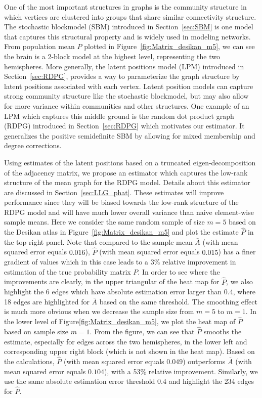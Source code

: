 One of the most important structures in graphs is the community structure in which vertices are clustered into groups that share similar connectivity structure. The stochastic blockmodel (SBM) \citep{holland1983stochastic} introduced in Section~\ref{sec:SBM} is one model that captures this structural property and is widely used in modeling networks. From population mean $P$ plotted in Figure~\ref{fig:Matrix_desikan_m5}, we can see the brain is a 2-block model at the highest level, representing the two hemispheres.
More generally, the latent positions model (LPM) \citep{hoff2002latent} introduced in Section~\ref{sec:RDPG}, provides a way to parameterize the graph structure by latent positions associated with each vertex. 
Latent position models can capture strong community structure like the stochastic blockmodel, but may also allow for more variance within communities and other structures.
One example of an LPM which captures this middle ground is the random dot product graph (RDPG) \citep{young2007random, nickel2008random} introduced in Section~\ref{sec:RDPG} which motivates our estimator. It generalizes the positive semidefinite SBM by allowing for mixed membership and degree corrections.

Using estimates of the latent positions based on a truncated eigen-decomposition of the adjacency matrix, we propose an estimator which captures the low-rank structure of the mean graph for the RDPG model. Details about this estimator are discussed in Section~\ref{sec:LLG_phat}.
These estimates will improve performance since they will be biased towards the low-rank structure of the RDPG model and will have much lower overall variance than naive element-wise sample means. Here we consider the same random sample of size $m=5$ based on the Desikan atlas in Figure~\ref{fig:Matrix_desikan_m5} and plot the estimate $\hat{P}$ in the top right panel. Note that compared to the sample mean $\bar{A}$ (with mean squared error equals $0.016$), $\hat{P}$ (with mean squared error equals $0.015$) has a finer gradient of values which in this case leads to a 3\% relative improvement in estimation of the true probability matrix $P$. In order to see where the improvements are clearly, in the upper triangular of the heat map for $\hat{P}$, we also highlight the 6 edges which have absolute estimation error larger than $0.4$, where 18 edges are highlighted for $\bar{A}$ based on the same threshold. 
The smoothing effect is much more obvious when we decrease the sample size from $m = 5$ to $m = 1$. In the lower level of Figure\ref{fig:Matrix_desikan_m5}, we plot the heat map of $\hat{P}$ based on sample size $m = 1$. From the figure, we can see that $\hat{P}$ smooths the estimate, especially for edges across the two hemispheres, in the lower left and corresponding upper right block (which is not shown in the heat map). Based on the calculations, $\hat{P}$ (with mean squared error equals $0.049$) outperforms $\bar{A}$ (with mean squared error equals $0.104$), with a 53\% relative improvement. Similarly, we use the same absolute estimation error threshold $0.4$ and highlight the 234 edges for $\hat{P}$.



